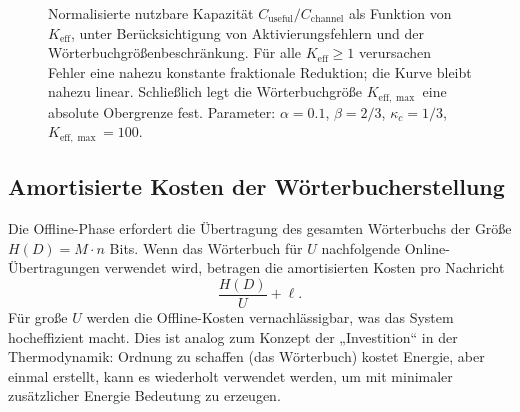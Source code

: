 \documentclass[12pt,a4paper]{article}
\theoremstyle{remark}
\newcommand{\Keff}{K_{\mathrm{eff}}}
\newcommand{\kappac}{\kappa_c}
\newcommand{\Keffmax}{K_{\mathrm{eff},\max}}
\begin{document}
	\begin{figure}[htbp]
		\centering
		\caption{Normalisierte nutzbare Kapazität $C_{\text{useful}}/C_{\text{channel}}$ als Funktion von $\Keff$, unter Berücksichtigung von Aktivierungsfehlern und der Wörterbuchgrößenbeschränkung. Für alle $K_{\mathrm{eff}} \ge 1$ verursachen Fehler eine nahezu konstante fraktionale Reduktion; die Kurve bleibt nahezu linear. Schließlich legt die Wörterbuchgröße $\Keffmax$ eine absolute Obergrenze fest. Parameter: $\alpha=0.1$, $\beta=2/3$, $\kappa_c=1/3$, $\Keffmax=100$.}
		\label{fig:useful-capacity}
	\end{figure}
	
	\subsection{Amortisierte Kosten der Wörterbucherstellung}
	
	Die Offline-Phase erfordert die Übertragung des gesamten Wörterbuchs der Größe $H(D) = M \cdot n$ Bits. Wenn das Wörterbuch für $U$ nachfolgende Online-Übertragungen verwendet wird, betragen die amortisierten Kosten pro Nachricht
	\[
	\frac{H(D)}{U} + \ell.
	\]
	Für große $U$ werden die Offline-Kosten vernachlässigbar, was das System hocheffizient macht. Dies ist analog zum Konzept der „Investition“ in der Thermodynamik: Ordnung zu schaffen (das Wörterbuch) kostet Energie, aber einmal erstellt, kann es wiederholt verwendet werden, um mit minimaler zusätzlicher Energie Bedeutung zu erzeugen.
	
\end{document}
